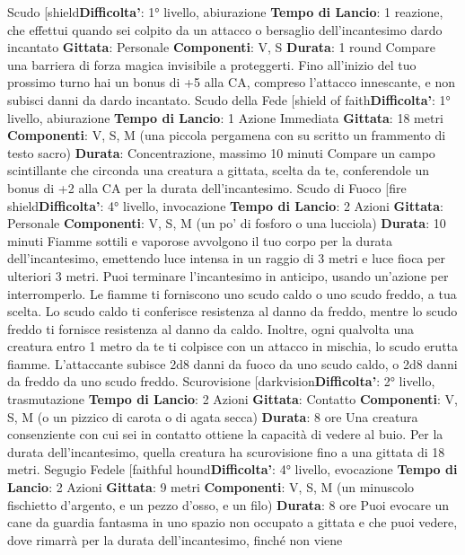 \begin{multicols}{2}
Scudo
[shield\textbf{Difficolta'}:
1° livello, abiurazione
\textbf{Tempo di Lancio}: 1 reazione, che effettui quando sei
colpito da un attacco o bersaglio dell’incantesimo dardo
incantato
\textbf{Gittata}: Personale
\textbf{Componenti}: V, S
\textbf{Durata}: 1 round
Compare una barriera di forza magica invisibile a
proteggerti. Fino all’inizio del tuo prossimo turno hai un
bonus di +5 alla CA, compreso l’attacco innescante, e
non subisci danni da dardo incantato.
Scudo della Fede
[shield of faith\textbf{Difficolta'}:
1° livello, abiurazione
\textbf{Tempo di Lancio}: 1 Azione Immediata
\textbf{Gittata}: 18 metri
\textbf{Componenti}: V, S, M (una piccola pergamena con su
scritto un frammento di testo sacro)
\textbf{Durata}: Concentrazione, massimo 10 minuti
Compare un campo scintillante che circonda una
creatura a gittata, scelta da te, conferendole un bonus
di +2 alla CA per la durata dell’incantesimo.
Scudo di Fuoco
[fire shield\textbf{Difficolta'}:
4° livello, invocazione
\textbf{Tempo di Lancio}: 2 Azioni
\textbf{Gittata}: Personale
\textbf{Componenti}: V, S, M (un po’ di fosforo o una lucciola)
\textbf{Durata}: 10 minuti
Fiamme sottili e vaporose avvolgono il tuo corpo per la
durata dell’incantesimo, emettendo luce intensa in un
raggio di 3 metri e luce fioca per ulteriori 3 metri. Puoi
terminare l’incantesimo in anticipo, usando un’azione
per interromperlo.
Le fiamme ti forniscono uno scudo caldo o uno scudo
freddo, a tua scelta. Lo scudo caldo ti conferisce
resistenza al danno da freddo, mentre lo scudo freddo ti
fornisce resistenza al danno da caldo.
Inoltre, ogni qualvolta una creatura entro 1 metro da te
ti colpisce con un attacco in mischia, lo scudo erutta
fiamme. L’attaccante subisce 2d8 danni da fuoco da
uno scudo caldo, o 2d8 danni da freddo da uno scudo
freddo.
Scurovisione
[darkvision\textbf{Difficolta'}:
2° livello, trasmutazione
\textbf{Tempo di Lancio}: 2 Azioni
\textbf{Gittata}: Contatto
\textbf{Componenti}: V, S, M (o un pizzico di carota o di agata
secca)
\textbf{Durata}: 8 ore
Una creatura consenziente con cui sei in contatto
ottiene la capacità di vedere al buio. Per la durata
dell’incantesimo, quella creatura ha scurovisione fino a
una gittata di 18 metri.
Segugio Fedele
[faithful hound\textbf{Difficolta'}:
4° livello, evocazione
\textbf{Tempo di Lancio}: 2 Azioni
\textbf{Gittata}: 9 metri
\textbf{Componenti}: V, S, M (un minuscolo fischietto
d’argento, e un pezzo d’osso, e un filo)
\textbf{Durata}: 8 ore
Puoi evocare un cane da guardia fantasma in uno
spazio non occupato a gittata e che puoi vedere, dove
rimarrà per la durata dell’incantesimo, finché non viene

\end{multicols}
